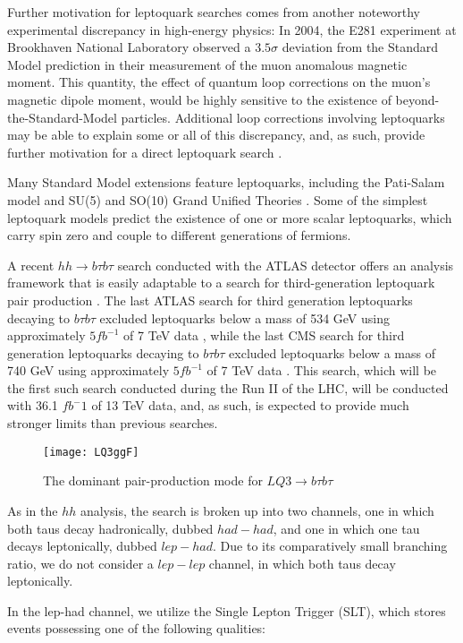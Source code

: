 \documentclass[
aps,
prl,
reprint,
showpacs,
]{revtex4-1}
\begin{document}
Further motivation for leptoquark searches comes from another noteworthy experimental discrepancy in high-energy physics: In 2004, the E281 experiment at Brookhaven National Laboratory observed a $3.5\sigma$ deviation from the Standard Model prediction in their measurement of the muon anomalous magnetic moment. This quantity, the effect of quantum loop corrections on the muon's magnetic dipole moment, would be highly sensitive to the existence of beyond-the-Standard-Model particles. Additional loop corrections involving leptoquarks may be able to explain some or all of this discrepancy, and, as such, provide further motivation for a direct leptoquark search \cite{Cheung}.


Many Standard Model extensions feature leptoquarks, including the Pati-Salam model and SU(5) and SO(10) Grand Unified Theories \cite{Sakaki}. Some of the simplest leptoquark models predict the existence of one or more scalar leptoquarks, which carry spin zero and couple to different generations of fermions. 


A recent $hh \rightarrow b\tau b\tau$ search conducted with the ATLAS detector offers an analysis framework that is easily adaptable to a search for third-generation leptoquark pair production \cite{hh}. The last ATLAS search for third generation leptoquarks decaying to $b\tau b\tau$ excluded leptoquarks below a mass of 534 GeV using approximately $5fb^{-1}$ of 7 TeV data \cite{lastATLAS}, while the last CMS search for third generation leptoquarks decaying to $b\tau b\tau$ excluded leptoquarks below a mass of 740 GeV using approximately $5fb^{-1}$ of 7 TeV data \cite{lastATLAS}. This search, which will be the first such search conducted during the Run II of the LHC, will be conducted with 36.1 $fb^-1$ of 13 TeV data, and, as such, is expected to provide much stronger limits than previous searches.


\begin{figure}[h]
\texttt{[image: LQ3ggF]} 
\caption{The dominant pair-production mode for $LQ3 \rightarrow b \tau b \tau$}
\label{fig:landscape}
\end{figure}


As in the $hh$ analysis, the search is broken up into two channels, one in which both taus decay hadronically, dubbed $had-had$, and one in which one tau decays leptonically, dubbed $lep-had$. Due to its comparatively small branching ratio, we do not consider a $lep-lep$ channel, in which both taus decay leptonically.

In the lep-had channel, we utilize the Single Lepton Trigger (SLT), which stores events possessing one of the following qualities:
\end{document}
